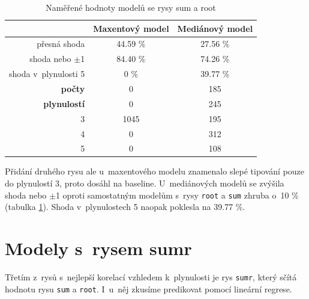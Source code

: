 \documentclass[12pt,a4paper]{report}
\begin{document}
\begin{table}[!htbp]
\begin{center}
\begin{tabular}{|r|c|c|}
\hline
& \textbf{Maxentový model} & \textbf{Mediánový model} \\
 \hline
přesná shoda & 44.59 \%  & 27.56 \%   \\
\hline
shoda nebo $\pm$1 & 84.40 \% & 74.26  \% \\
\hline
shoda v~plynulosti 5 & \color{red}0 \% & 39.77 \%   \\
\hline
     \textbf{počty} \quad 1 & \color{red}0   & 185   \\
\textbf{plynulostí} \quad 2 & \color{red}0   & 245  \\
                          3 & 1045           & 195  \\
                          4 & \color{red}0   & 312 \\
                          5 & \color{red}0   & 108  \\
\hline
\end{tabular}
\caption{Naměřené hodnoty modelů se rysy sum a root}\label{tb:sumroot}
\end{center}
\end{table}


Přidání druhého rysu ale u~maxentového modelu znamenalo slepé tipování pouze do plynulostí 3, proto dosáhl na baseline. U~mediánových modelů se zvýšila shoda nebo $\pm$1 oproti samostatným modelům s~rysy \texttt{root} a \texttt{sum} zhruba o~10 \% (tabulka \ref{tb:sumroot}). Shoda v~plynulostech 5 naopak poklesla na 39.77 \%.





\section{Modely s~rysem sumr}
Třetím z~rysů s~nejlepší korelací vzhledem k~plynulosti je rys \texttt{sumr}, který sčítá hodnotu rysu \texttt{sum} a \texttt{root}. I~u~něj zkusíme predikovat pomocí lineární regrese.
\end{document}
